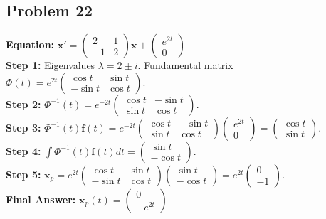 \documentclass[11pt]{article}
\begin{document}
\subsection*{Problem 22}
\textbf{Equation:} $\mathbf{x}' = \begin{pmatrix} 2 & 1 \\ -1 & 2 \end{pmatrix} \mathbf{x} + \begin{pmatrix} e^{2t} \\ 0 \end{pmatrix}$ \\
\textbf{Step 1:} Eigenvalues $\lambda = 2 \pm i$. Fundamental matrix $\Phi(t) = e^{2t} \begin{pmatrix} \cos t & \sin t \\ -\sin t & \cos t \end{pmatrix}$. \\
\textbf{Step 2:} $\Phi^{-1}(t) = e^{-2t} \begin{pmatrix} \cos t & -\sin t \\ \sin t & \cos t \end{pmatrix}$. \\
\textbf{Step 3:} $\Phi^{-1}(t)\mathbf{f}(t) = e^{-2t} \begin{pmatrix} \cos t & -\sin t \\ \sin t & \cos t \end{pmatrix} \begin{pmatrix} e^{2t} \\ 0 \end{pmatrix} = \begin{pmatrix} \cos t \\ \sin t \end{pmatrix}$. \\
\textbf{Step 4:} $\int \Phi^{-1}(t)\mathbf{f}(t) dt = \begin{pmatrix} \sin t \\ -\cos t \end{pmatrix}$. \\
\textbf{Step 5:} $\mathbf{x}_p = e^{2t} \begin{pmatrix} \cos t & \sin t \\ -\sin t & \cos t \end{pmatrix} \begin{pmatrix} \sin t \\ -\cos t \end{pmatrix} = e^{2t} \begin{pmatrix} 0 \\ -1 \end{pmatrix}$. \\
\textbf{Final Answer:} $\mathbf{x}_p(t) = \begin{pmatrix} 0 \\ -e^{2t} \end{pmatrix}$
\end{document}
